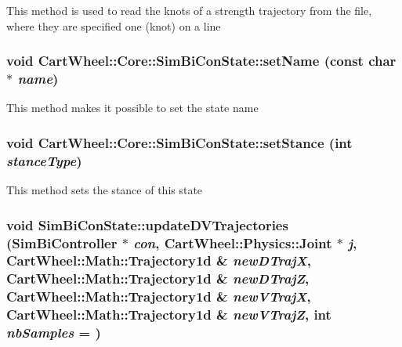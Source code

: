 This method is used to read the knots of a strength trajectory from the file, where they are specified one (knot) on a line \hypertarget{classCartWheel_1_1Core_1_1SimBiConState_a8209dec439b619e93f5aaeef082099ba}{
\subsubsection[{setName}]{\setlength{\rightskip}{0pt plus 5cm}void CartWheel::Core::SimBiConState::setName (const char $\ast$ {\em name})}}
\label{classCartWheel_1_1Core_1_1SimBiConState_a8209dec439b619e93f5aaeef082099ba}
This method makes it possible to set the state name \hypertarget{classCartWheel_1_1Core_1_1SimBiConState_a40c20a88587b8e9aada69d55bdbe9d96}{
\subsubsection[{setStance}]{\setlength{\rightskip}{0pt plus 5cm}void CartWheel::Core::SimBiConState::setStance (int {\em stanceType})}}
\label{classCartWheel_1_1Core_1_1SimBiConState_a40c20a88587b8e9aada69d55bdbe9d96}
This method sets the stance of this state \hypertarget{classCartWheel_1_1Core_1_1SimBiConState_ad49b8e2032a48c6bc1a9dba06d601ce5}{
\subsubsection[{updateDVTrajectories}]{\setlength{\rightskip}{0pt plus 5cm}void SimBiConState::updateDVTrajectories ({\bf SimBiController} $\ast$ {\em con}, \/  {\bf CartWheel::Physics::Joint} $\ast$ {\em j}, \/  {\bf CartWheel::Math::Trajectory1d} \& {\em newDTrajX}, \/  {\bf CartWheel::Math::Trajectory1d} \& {\em newDTrajZ}, \/  {\bf CartWheel::Math::Trajectory1d} \& {\em newVTrajX}, \/  {\bf CartWheel::Math::Trajectory1d} \& {\em newVTrajZ}, \/  int {\em nbSamples} = {})}}
